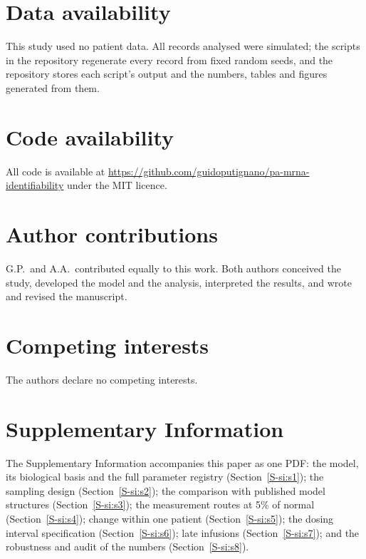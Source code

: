 \documentclass[11pt]{article}
\begin{document}
\section*{Data availability}
This study used no patient data. All records analysed were simulated; the scripts in the repository
regenerate every record from fixed random seeds, and the repository stores each script's output and
the numbers, tables and figures generated from them.

\section*{Code availability}
All code is available at
\url{https://github.com/guidoputignano/pa-mrna-identifiability} under the MIT licence.

\section*{Author contributions}
G.P.\ and A.A.\ contributed equally to this work. Both authors conceived the study, developed the
model and the analysis, interpreted the results, and wrote and revised the manuscript.

\section*{Competing interests}
The authors declare no competing interests.

\section*{Supplementary Information}
The Supplementary Information accompanies this paper as one PDF: the model, its biological basis
and the full parameter registry (Section~\ref{S-si:s1}); the sampling design
(Section~\ref{S-si:s2}); the comparison with published model structures (Section~\ref{S-si:s3});
the measurement routes at 5\% of normal (Section~\ref{S-si:s4}); change within one patient
(Section~\ref{S-si:s5}); the dosing interval specification (Section~\ref{S-si:s6}); late
infusions (Section~\ref{S-si:s7}); and the robustness and audit of the numbers
(Section~\ref{S-si:s8}).



\end{document}
